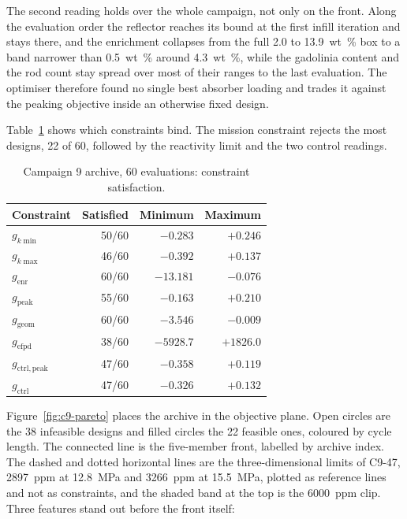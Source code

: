 The second reading holds over the whole campaign, not only on the
front. Along the evaluation order the reflector reaches its bound at the
first infill iteration and stays there, and the enrichment collapses
from the full 2.0 to \SI{13.9}{wt\%} box to a band narrower than
\SI{0.5}{wt\%} around \SI{4.3}{wt\%}, while the gadolinia content and
the rod count stay spread over most of their ranges to the last
evaluation. The optimiser therefore found no single best absorber
loading and trades it against the peaking objective inside an otherwise
fixed design.

Table~\ref{tab:c9-constraints} shows which constraints bind. The mission
constraint rejects the most designs, 22 of 60, followed by the reactivity
limit and the two control readings.

\begin{table}[htbp]
  \centering
  \caption{Campaign 9 archive, 60 evaluations: constraint satisfaction.}
  \label{tab:c9-constraints}
  \small
  \begin{tabular}{@{}lrrr@{}}
    \toprule
    Constraint & Satisfied & Minimum & Maximum \\
    \midrule
    $g_{k\min}$            & 50/60 & $-0.283$ & $+0.246$ \\
    $g_{k\max}$            & 46/60 & $-0.392$ & $+0.137$ \\
    $g_\mathrm{enr}$       & 60/60 & $-13.181$ & $-0.076$ \\
    $g_\mathrm{peak}$      & 55/60 & $-0.163$ & $+0.210$ \\
    $g_\mathrm{geom}$      & 60/60 & $-3.546$ & $-0.009$ \\
    $g_\mathrm{efpd}$      & 38/60 & $-5928.7$ & $+1826.0$ \\
    $g_\mathrm{ctrl,peak}$ & 47/60 & $-0.358$ & $+0.119$ \\
    $g_\mathrm{ctrl}$      & 47/60 & $-0.326$ & $+0.132$ \\
    \bottomrule
  \end{tabular}
\end{table}

Figure~\ref{fig:c9-pareto} places the archive in the objective plane. Open
circles are the 38 infeasible designs and filled circles the 22 feasible
ones, coloured by cycle length. The connected line is the five-member
front, labelled by archive index. The dashed and dotted horizontal lines
are the three-dimensional limits of C9-47, \SI{2897}{ppm} at
\SI{12.8}{MPa} and \SI{3266}{ppm} at \SI{15.5}{MPa}, plotted as reference
lines and not as constraints, and the shaded band at the top is the
\SI{6000}{ppm} clip. Three features stand out before the front itself:

